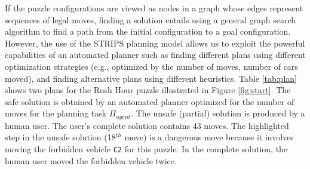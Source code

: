 If the puzzle configurations are viewed as nodes in a graph whose edges represent sequences of legal moves, finding a solution entails using a general graph search algorithm to find a path from the initial configuration to a goal configuration. However, the use of the STRIPS planning model allows us to exploit the powerful capabilities of an automated planner such as finding different plans using different optimization strategies (e.g., optimized by the number of moves, number of cars moved),  and finding alternative plans using different heuristics. Table \ref{tab:plan} shows two plans for the Rush Hour puzzle illustrated in Figure \ref{fig:start}. The safe solution is obtained by an automated planner optimized for the number of moves for the planning task $\Pi_{agent}$. The unsafe (partial) solution is produced by a human user. The user's complete solution contains 43 moves. The highlighted step in the unsafe solution (18$^{th}$ move) is a dangerous move because it involves moving the forbidden vehicle \texttt{C2} for this puzzle. In the complete solution, the human user moved the forbidden vehicle twice.

